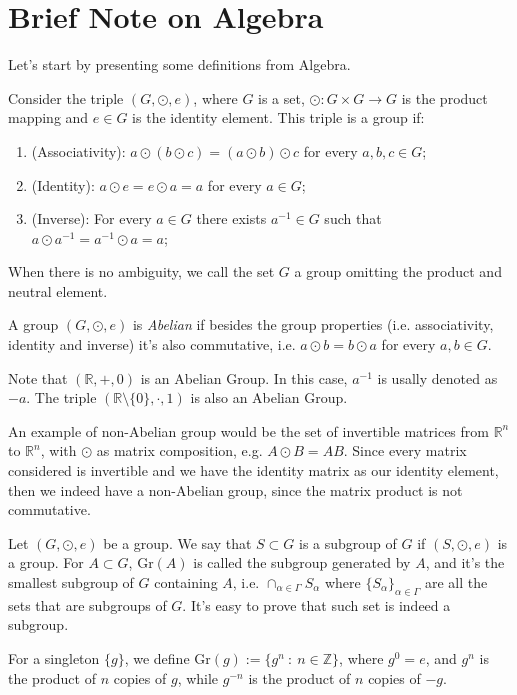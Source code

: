 \section{Brief Note on Algebra}

Let's start by presenting some definitions from Algebra.

\begin{definition}[Groups]
	Consider the triple $(G, \odot, e)$, where $G$ is a set,
	$\odot : G \times G \to G$ is the product mapping
	and $e \in G$ is the identity element.
	This triple is a group if:
	\begin{enumerate}
		\item (Associativity): $a \odot (b \odot c) = (a \odot b) \odot c$ for every $a,b,c \in G$;
		\item (Identity): $a \odot e = e \odot a  = a$ for every $a \in G$;
		\item (Inverse): For every $a \in G$ there exists $a^{-1} \in G$ such that
		      $a\odot a^{-1} = a^{-1}\odot a = a$;
	\end{enumerate}

	When there is no ambiguity, we call the set $G$ a group omitting
	the product and neutral element.
\end{definition}

\begin{definition}
	A group $(G, \odot, e)$ is \textit{Abelian} if besides the group properties
	(i.e. associativity, identity and inverse)
	it's also commutative, i.e. $a \odot b = b \odot a$ for every $a,b \in G$.
\end{definition}

\begin{example}
	Note that $(\mathbb R, +, 0)$ is an Abelian Group.
	In this case, $a^{-1}$ is usally denoted as $-a$.
	The triple $(\mathbb R \setminus \{0\}, \cdot, 1)$ is also an Abelian Group.

	An example of non-Abelian group would be the set of invertible
	matrices from $\mathbb R^n$ to $\mathbb R^n$,
	with $\odot$ as matrix composition, e.g.
	$A \odot B = A B$. Since every matrix considered is invertible
	and we have the identity matrix as our identity element,
	then we indeed have a non-Abelian group,
	since the matrix product is not commutative.
\end{example}

\begin{definition}
	Let $(G, \odot, e)$ be a group. We say that $S\subset G$ is a
	subgroup of $G$ if $(S, \odot, e)$ is a group.
	For $A \subset G$, $\text{Gr}(A)$ is called the subgroup generated by $A$,
	and it's the smallest subgroup of $G$ containing $A$, i.e.
	$\cap_{\alpha \in \Gamma} S_\alpha$ where $\{S_\alpha\}_{\alpha \in \Gamma}$ are
	all the sets that are subgroups of $G$.
	It's easy to prove that such set is indeed a subgroup.

	For a singleton $\{g\}$, we define
	$\text{Gr}(g) := \{g^n \ : \ n \in \mathbb Z\}$, where
	$g^0 = e$, and $g^n$ is the product of $n$ copies of $g$,
	while $g^{-n}$ is the product of $n$ copies of $-g$.
\end{definition}

